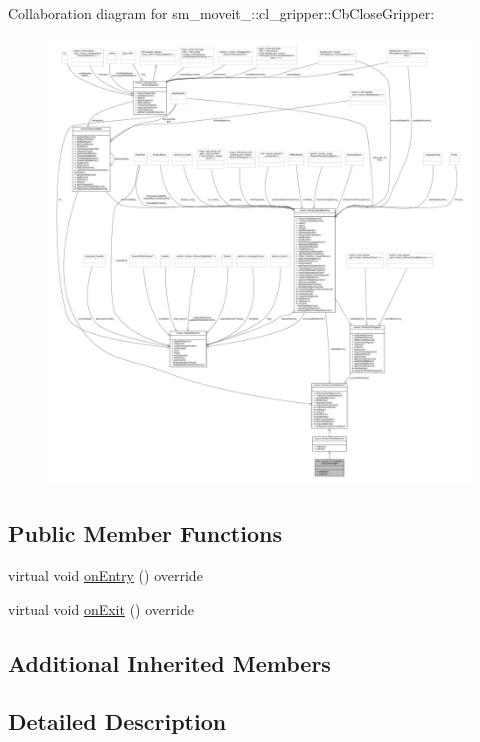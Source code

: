 Collaboration diagram for sm\+\_\+moveit\+\_\+:\+:cl\+\_\+gripper\+:\+:Cb\+Close\+Gripper\+:
\nopagebreak
\begin{figure}[H]
\begin{center}
\leavevmode
\includegraphics[width=350pt]{classsm__moveit__4_1_1cl__gripper_1_1CbCloseGripper__coll__graph}
\end{center}
\end{figure}
\subsection*{Public Member Functions}
\begin{DoxyCompactItemize}
\item 
virtual void \hyperlink{classsm__moveit__4_1_1cl__gripper_1_1CbCloseGripper_ada79ea2869c0297ced61d086bb8def81}{on\+Entry} () override
\item 
virtual void \hyperlink{classsm__moveit__4_1_1cl__gripper_1_1CbCloseGripper_a9c907d899c60fff004eb9f2d5e29913b}{on\+Exit} () override
\end{DoxyCompactItemize}
\subsection*{Additional Inherited Members}


\subsection{Detailed Description}


